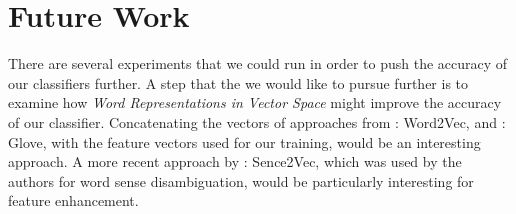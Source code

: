 \section{Future Work}
\label{future_work}


There are several experiments that we could run in order to push the accuracy of our classifiers further. A step that the we would like to pursue further is to examine how \textit{Word Representations in Vector Space} might improve the accuracy of our classifier. Concatenating the vectors of approaches from : Word2Vec, and : Glove, with the feature vectors used for our training, would be an interesting approach. A more recent approach by : Sence2Vec, which was used by the authors for word sense disambiguation, would be particularly interesting for feature enhancement.